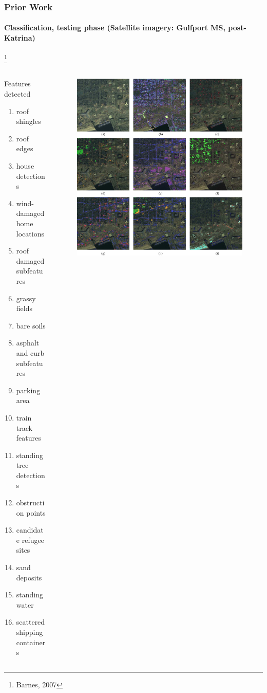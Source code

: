 \begin{frame}[plain]
\frametitle{Prior Work}
\framesubtitle{\small Classification, testing phase (Satellite imagery: Gulfport MS, post-Katrina)}
\mypagenum\footnote{Barnes, 2007}
	\begin{columns}
		\begin{column}{0.8in}
			\begin{changemargin}{-1.3in}{0in}
				Features detected
				\begin{enumerate}\tiny
					\item roof shingles
					\item roof edges
					\item house detections
					\item wind-damaged home locations
					\item roof damaged subfeatures
					\item grassy fields
					\item bare soils
					\item asphalt and curb subfeatures
					\item parking area
					\item train track features
					\item standing tree detections
					\item obstruction points
					\item candidate refugee sites
					\item sand deposits
					\item standing water
					\item scattered shipping containers
				\end{enumerate}
			\end{changemargin}
		\end{column}
	\begin{column}{2.8in}
			\begin{figure}		
				\includegraphics[height=0.65\textheight]{figs/RVQ_SatelliteKatrina_3_labeling.png}

\end{figure}
\end{column}
\end{columns}
\end{frame}

